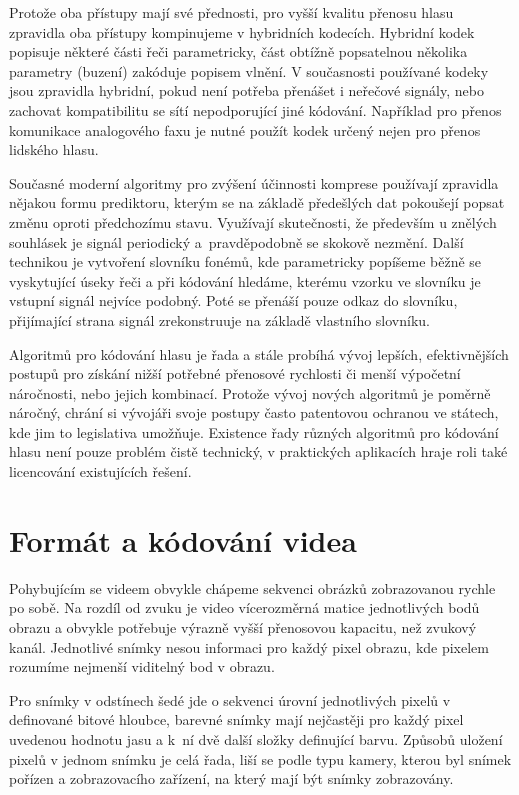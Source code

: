 Protože oba přístupy mají své přednosti, pro vyšší kvalitu přenosu hlasu 
zpravidla oba přístupy kompinujeme v hybridních kodecích. Hybridní kodek
popisuje některé části řeči parametricky, část obtížně popsatelnou několika
parametry (buzení) zakóduje popisem vlnění. V současnosti používané kodeky jsou 
zpravidla hybridní, pokud není potřeba přenášet i neřečové signály,
nebo zachovat kompatibilitu se sítí nepodporující jiné kódování. Například 
pro přenos komunikace analogového faxu je nutné použít kodek určený nejen pro přenos 
lidského hlasu.

Současné moderní algoritmy pro zvýšení účinnosti komprese používají zpravidla
nějakou formu prediktoru, kterým se na základě předešlých dat pokoušejí
popsat změnu oproti předchozímu stavu. Využívají skutečnosti, že především
u znělých souhlásek je signál periodický a~pravděpodobně se skokově nezmění.
Další technikou je vytvoření slovníku fonémů, kde parametricky popíšeme
běžně se vyskytující úseky řeči a při kódování hledáme, kterému vzorku ve 
slovníku je vstupní signál nejvíce podobný. Poté se přenáší pouze odkaz
do slovníku, přijímající strana signál zrekonstruuje na základě vlastního
slovníku.

Algoritmů pro kódování hlasu je řada a stále probíhá vývoj lepších, 
efektivnějších postupů pro získání nižší potřebné přenosové rychlosti 
či menší výpočetní náročnosti, nebo jejich kombinací. 
Protože vývoj nových algoritmů je poměrně
náročný, chrání si vývojáři svoje postupy často patentovou ochranou ve státech,
kde jim to legislativa umožňuje. Existence řady různých algoritmů pro kódování
hlasu není pouze problém čistě technický, v praktických aplikacích hraje roli
také licencování existujících řešení. 

\section{Formát a kódování videa}

Pohybujícím se videem obvykle chápeme sekvenci obrázků zobrazovanou rychle po
sobě. Na rozdíl od zvuku je video vícerozměrná matice jednotlivých bodů obrazu a obvykle potřebuje výrazně vyšší přenosovou kapacitu, než zvukový kanál. Jednotlivé snímky nesou informaci pro každý pixel obrazu, kde pixelem
rozumíme nejmenší viditelný bod v obrazu. 

Pro snímky v odstínech šedé jde o sekvenci úrovní jednotlivých pixelů v definované bitové hloubce, barevné
snímky mají nejčastěji pro každý pixel uvedenou hodnotu jasu a k~ní dvě další
složky definující barvu. Způsobů uložení pixelů v jednom snímku je celá řada,
liší se podle typu kamery, kterou byl snímek pořízen a zobrazovacího zařízení, na který mají být snímky zobrazovány. 

